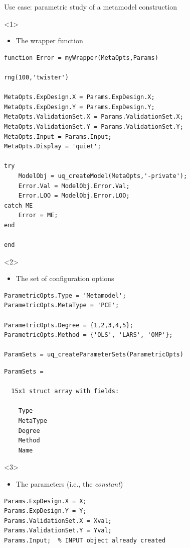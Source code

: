 \documentclass[]{rsuqbeamernew}
\begin{document}
\begin{frame}[fragile]{Use case: parametric study of a metamodel construction}

\begin{onlyenv}<1>
\begin{itemize}
  \item The wrapper function
\end{itemize}
\begin{lstlisting}
function Error = myWrapper(MetaOpts,Params)

rng(100,'twister')

MetaOpts.ExpDesign.X = Params.ExpDesign.X;
MetaOpts.ExpDesign.Y = Params.ExpDesign.Y;
MetaOpts.ValidationSet.X = Params.ValidationSet.X;
MetaOpts.ValidationSet.Y = Params.ValidationSet.Y;
MetaOpts.Input = Params.Input;
MetaOpts.Display = 'quiet';
  
try
    ModelObj = uq_createModel(MetaOpts,'-private');
    Error.Val = ModelObj.Error.Val;
    Error.LOO = ModelObj.Error.LOO;
catch ME
    Error = ME;
end

end
\end{lstlisting}
\end{onlyenv}


\begin{onlyenv}<2>
\begin{itemize}
  \item The set of configuration options
\end{itemize}
\begin{lstlisting}
ParametricOpts.Type = 'Metamodel';
ParametricOpts.MetaType = 'PCE';
  
ParametricOpts.Degree = {1,2,3,4,5};
ParametricOpts.Method = {'OLS', 'LARS', 'OMP'};

ParamSets = uq_createParameterSets(ParametricOpts)
\end{lstlisting}

\begin{lstlisting}[numbers=none]
ParamSets = 

  15x1 struct array with fields:

    Type
    MetaType
    Degree
    Method
    Name
\end{lstlisting}

\end{onlyenv}

\begin{onlyenv}<3>
\begin{itemize}
  \item The parameters (i.e., the \emph{constant})
\end{itemize}
\begin{lstlisting}
Params.ExpDesign.X = X;
Params.ExpDesign.Y = Y;
Params.ValidationSet.X = Xval;
Params.ValidationSet.Y = Yval;
Params.Input;  % INPUT object already created
\end{lstlisting}
\end{onlyenv}


\end{frame}
\end{document}

